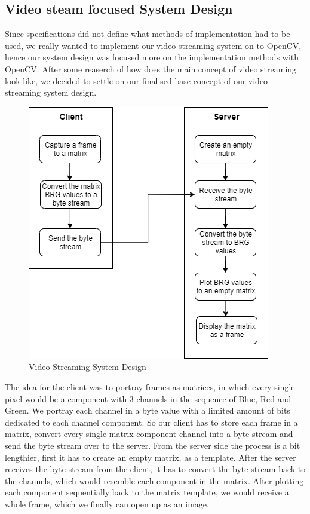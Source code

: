 \documentclass[conference]{IEEEtran}
\begin{document}
\subsection{Video steam focused System Design}
Since specifications did not define what methods of implementation had to be used, we really wanted to implement our video streaming system on to OpenCV, hence our system design was focused more on the implementation methods with
OpenCV. After some reaserch of how does the main concept of video streaming look like, we decided to settle on our finalised base concept of our video streaming system design.
\begin{figure}[h!]
	\includegraphics[width=\linewidth]{StreamConceptActivityDiagram.png}
	\caption{Video Streaming System Design}
	\label{fig:VSSD1}
\end{figure}
The idea for the client was to portray frames as matrices, in which every single pixel would be a component with 3 channels in the sequence of Blue, Red and Green. We portray each channel in a byte value with a limited amount of bits dedicated to each channel component. So our client has to store each frame in a matrix, convert every single matrix component channel into a byte stream and send the byte stream over to the server. From the server side the process is a bit lengthier, first it has to create an empty matrix, as a template. After the server receives the byte stream from the client, it has to convert the byte stream back to the channels, which would resemble each component in the matrix. After plotting each component sequentially back to the matrix template, we would receive a whole frame, which we finally can open up as an image.
\end{document}

